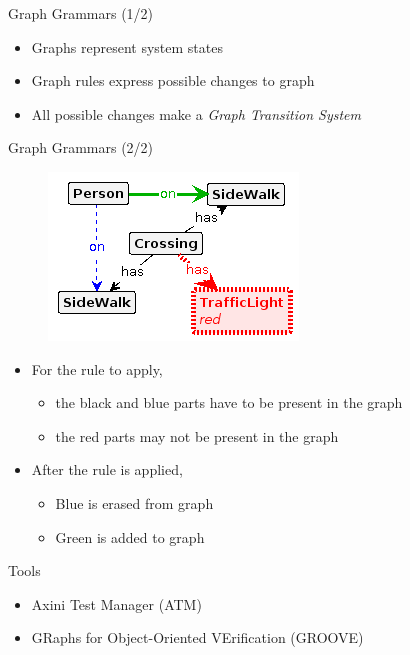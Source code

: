 \documentclass{FMTslides}
\begin{document}
\begin{frame}{Graph Grammars (1/2)}
\begin{figure}
\centering
    \hspace{10px}
\end{figure}

\begin{itemize}
  \item Graphs represent system states
  \item Graph rules express possible changes to graph
  \item All possible changes make a \textit{Graph Transition System}
\end{itemize}
\end{frame}

\begin{frame}{Graph Grammars (2/2)}
\begin{figure}
\includegraphics[scale=0.6]{./figures/cross.png}
\end{figure}
\begin{itemize}
  \item For the rule to apply,
  \begin{itemize}
    \item the black and blue parts have to be present in the graph
    \item the red parts may not be present in the graph
  \end{itemize}
  \item After the rule is applied,
  \begin{itemize}
    \item Blue is erased from graph
    \item Green is added to graph
  \end{itemize}
\end{itemize}
\end{frame}

\begin{frame}{Tools}
\begin{itemize}
\item Axini Test Manager (ATM)
\item GRaphs for Object-Oriented VErification (GROOVE)
\end{itemize}
\end{frame}
\end{document}
